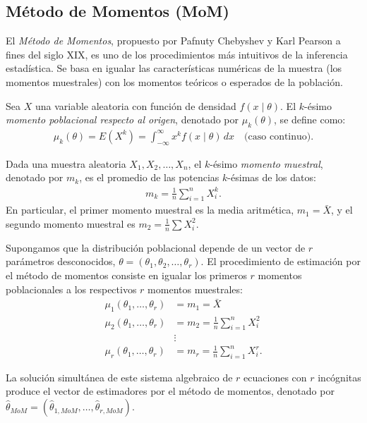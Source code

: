 \subsection{Método de Momentos (MoM)}

El \emph{Método de Momentos}, propuesto por Pafnuty Chebyshev y Karl Pearson a fines del siglo XIX, es uno de los procedimientos más intuitivos de la inferencia estadística. Se basa en igualar las características numéricas de la muestra (los momentos muestrales) con los momentos teóricos o esperados de la población.

\begin{definicion}
	Sea $X$ una variable aleatoria con función de densidad $f(x \mid \theta)$. El $k$-ésimo \emph{momento poblacional respecto al origen}, denotado por $\mu_k(\theta)$, se define como:
	\begin{align}
		\mu_k(\theta) = E(X^k) = \int_{-\infty}^{\infty} x^k f(x \mid \theta) \, dx \quad \text{(caso continuo)}.
	\end{align}

	Dada una muestra aleatoria $X_1, X_2, \ldots, X_n$, el $k$-ésimo \emph{momento muestral}, denotado por $m_k$, es el promedio de las potencias $k$-ésimas de los datos:
	\begin{align}
		m_k = \frac{1}{n} \sum_{i=1}^n X_i^k.
	\end{align}
	En particular, el primer momento muestral es la media aritmética, $m_1 = \bar{X}$, y el segundo momento muestral es $m_2 = \frac{1}{n}\sum X_i^2$.
\end{definicion}

\begin{teorema}
	Supongamos que la distribución poblacional depende de un vector de $r$ parámetros desconocidos, $\theta = (\theta_1, \theta_2, \ldots, \theta_r)$. El procedimiento de estimación por el método de momentos consiste en igualar los primeros $r$ momentos poblacionales a los respectivos $r$ momentos muestrales:
	\begin{align}
		\mu_1(\theta_1, \ldots, \theta_r) &= m_1 = \bar{X} \nonumber \\
		\mu_2(\theta_1, \ldots, \theta_r) &= m_2 = \frac{1}{n}\sum_{i=1}^n X_i^2 \nonumber \\
		&\vdots \nonumber \\
		\mu_r(\theta_1, \ldots, \theta_r) &= m_r = \frac{1}{n}\sum_{i=1}^n X_i^r.
		\label{eq:mom_sistema}
	\end{align}

	La solución simultánea de este sistema algebraico de $r$ ecuaciones con $r$ incógnitas produce el vector de estimadores por el método de momentos, denotado por $\hat{\theta}_{MoM} = (\hat{\theta}_{1, MoM}, \ldots, \hat{\theta}_{r, MoM})$.
\end{teorema}

